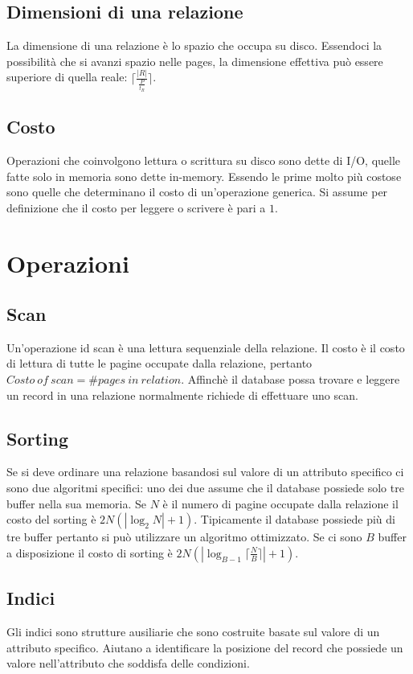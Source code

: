 \subsection{Dimensioni di una relazione}
La dimensione di una relazione \`e lo spazio che occupa su disco. Essendoci la possibilit\`a che si avanzi spazio nelle pages, la dimensione effettiva pu\`o
essere superiore di quella reale: $\lceil\frac{|R|}{\frac{P}{t_R}}\rceil$.
\subsection{Costo}
Operazioni che coinvolgono lettura o scrittura su disco sono dette di I/O, quelle fatte solo in memoria sono dette in-memory. Essendo le prime molto pi\`u costose sono quelle che determinano il costo di 
un'operazione generica. Si assume per definizione che il costo per leggere o scrivere \`e pari a $1$. 
\section{Operazioni}
\subsection{Scan}
Un'operazione id scan \`e una lettura sequenziale della relazione. Il costo \`e il costo di lettura di tutte le pagine occupate dalla relazione, pertanto $Costo\ of\ scan= \# pages\ in\ relation$. Affinch\`e il database
possa trovare e leggere un record in una relazione normalmente richiede di effettuare uno scan. 
\subsection{Sorting}
Se si deve ordinare una relazione basandosi sul valore di un attributo specifico ci sono due algoritmi specifici: uno dei due assume che il database possiede solo tre buffer nella sua memoria. Se $N$ \`e il numero di
pagine occupate dalla relazione il costo del sorting \`e $2N(|\log_2 N|+1)$. Tipicamente il database possiede pi\`u di tre buffer pertanto si pu\`o utilizzare un algoritmo ottimizzato. Se ci sono $B$ buffer a 
disposizione il costo di sorting \`e $2N(|\log_{B-1}\lceil \frac{N}{B}\rceil|+1)$.
\subsection{Indici}
Gli indici sono strutture ausiliarie che sono costruite basate sul valore di un attributo specifico. Aiutano a identificare la posizione del record che possiede un valore nell'attributo che soddisfa delle condizioni. 

